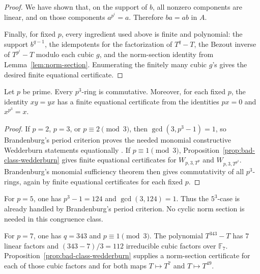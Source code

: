 \begin{proof}
  We have shown that, on the support of \(b\), all nonzero components are linear, and on those components \(a^{p^i}=a\).  Therefore \(ba=ab\) in \(A\).

  Finally, for fixed \(p\), every ingredient used above is finite and polynomial: the support \(b^{q-1}\), the idempotents for the factorization of \(T^q-T\), the Bezout inverse of \(T^{p^i}-T\) modulo each cubic \(g\), and the norm-section identity from Lemma~\ref{lem:norm-section}.  Enumerating the finitely many cubic \(g\)'s gives the desired finite equational certificate.
\end{proof}

\begin{theorem}\label{thm:main}
  Let \(p\) be prime.  Every \(p^3\)-ring is commutative.  Moreover, for each fixed \(p\), the identity \(xy=yx\) has a finite equational certificate from the identities \(px=0\) and \(x^{p^3}=x\).
\end{theorem}

\begin{proof}
  If \(p=2\), \(p=3\), or \(p\equiv 2 \pmod 3\), then \(\gcd(3,p^3-1)=1\), so Brandenburg's period criterion proves the needed monomial constructive Wedderburn statements equationally \cite{brandenburg2023}.  If \(p\equiv 1 \pmod 3\), Proposition~\ref{prop:bad-class-wedderburn} gives finite equational certificates for \(W_{p,3,T^p}\) and \(W_{p,3,T^{p^2}}\).  Brandenburg's monomial sufficiency theorem then gives commutativity of all \(p^3\)-rings, again by finite equational certificates for each fixed \(p\).
\end{proof}

\begin{example}\label{ex:p5}
  For \(p=5\), one has \(p^3-1=124\) and \(\gcd(3,124)=1\).  Thus the \(5^3\)-case is already handled by Brandenburg's period criterion.  No cyclic norm section is needed in this congruence class.
\end{example}

\begin{example}\label{ex:p7}
  For \(p=7\), one has \(q=343\) and \(p\equiv 1 \pmod 3\).  The polynomial \(T^{343}-T\) has \(7\) linear factors and \((343-7)/3=112\) irreducible cubic factors over \(\mathbb F_7\).  Proposition~\ref{prop:bad-class-wedderburn} supplies a norm-section certificate for each of those cubic factors and for both maps \(T\mapsto T^7\) and \(T\mapsto T^{49}\).
\end{example}

